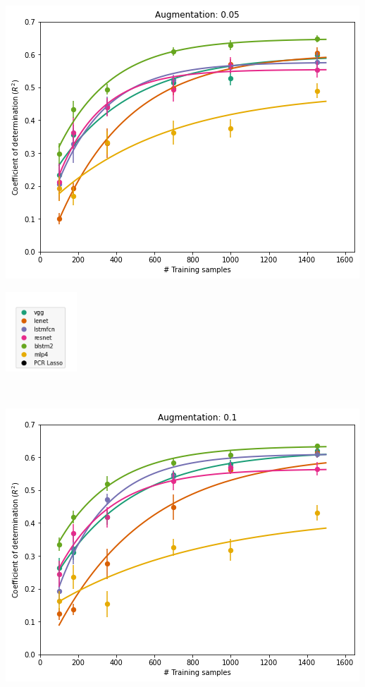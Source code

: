 \documentclass[a0paper,landscape,fontscale=0.365]{baposter}
\newenvironment{Figure}
  {\par\medskip\noindent\minipage{\linewidth}}
  {\endminipage\par\medskip}
\begin{document}
\begin{poster}
{\begin{multicols}{4}
    \begin{Figure}
        \centering
        \includegraphics[width=1.0\linewidth]{figures/curves_aug_20}
    \end{Figure}
    \columnbreak

    \begin{Figure}
        \includegraphics[height=3cm]{figures/legend}
    \end{Figure}

\end{multicols}
\\
\begin{multicols}{4}
    \begin{Figure}
        \centering
        \includegraphics[width=1.0\linewidth]{figures/curves_aug_10}
    \end{Figure}


\end{multicols}}
\end{poster}
\end{document}

